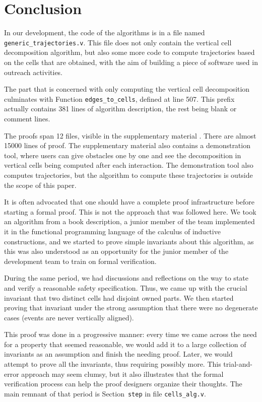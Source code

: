 \documentclass[a4paper, USenglish, cleveref, autoref, thm-restate, final]{lipics-v2021}
\begin{document}
\section{Conclusion}
In our development, the code of the algorithms is in a
file named {\tt generic\_trajectories.v}.  This file does not only contain
the vertical cell decomposition algorithm, but also some more code to compute
trajectories based on the cells that are obtained, with the aim of building
a piece of software used in outreach activities.

The part that is concerned with only computing the vertical cell decomposition
culminates with Function {\tt edges\_to\_cells}, defined at line 507.
This prefix actually contains 381 lines of algorithm description, the
rest being blank or comment lines.

The proofs span 12 files, visible in the supplementary material \cite{suppl_material}.
There are almost 15000 lines of proof.  The supplementary material also
contains a demonstration tool, where users can give obstacles one by one
and see the decomposition in vertical cells being computed after each
interaction.  The demonstration tool also computes trajectories, but the
algorithm to compute these trajectories is outside the scope of this paper.

It is often advocated that one should have a complete proof
infrastructure before starting a formal proof.  This is not the
approach that was followed here.  We took an algorithm from a book
description, a junior member of the team implemented it in the
functional programming language of the calculus of inductive
constructions, and we started to prove simple invariants about this
algorithm, as this was also understood as an opportunity for the junior
member of the development team to train on formal verification.

During the same period, we had discussions and reflections on the way to
state and verify a reasonable safety specification.  Thus, we came up with the
crucial invariant that two distinct cells had disjoint owned parts.  We then
started proving that invariant under the strong assumption that there
were no degenerate cases (events are never vertically aligned).

This proof was done in a progressive manner: every time we came
across the need for a property that seemed reasonable, we would add it to
a large collection of invariants as an assumption and finish the needing proof.
Later, we would attempt to prove all the invariants, thus requiring possibly
more.  This trial-and-error approach may seem clumsy, but it also illustrates
that the formal verification process can help the proof designers organize
their thoughts.  The main remnant of that period is Section~{\tt step} in
file {\tt cells\_alg.v}.
\end{document}
